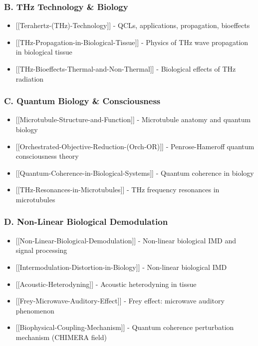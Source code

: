 \subsubsection{B. THz Technology \&
Biology}\label{b.-thz-technology-biology}

\begin{itemize}
\tightlist
\item
  {[}{[}Terahertz-(THz)-Technology{]}{]} - QCLs, applications,
  propagation, bioeffects
\item
  {[}{[}THz-Propagation-in-Biological-Tissue{]}{]} - Physics of THz wave
  propagation in biological tissue
\item
  {[}{[}THz-Bioeffects-Thermal-and-Non-Thermal{]}{]} - Biological
  effects of THz radiation
\end{itemize}

\subsubsection{C. Quantum Biology \&
Consciousness}\label{c.-quantum-biology-consciousness}

\begin{itemize}
\tightlist
\item
  {[}{[}Microtubule-Structure-and-Function{]}{]} - Microtubule anatomy
  and quantum biology
\item
  {[}{[}Orchestrated-Objective-Reduction-(Orch-OR){]}{]} -
  Penrose-Hameroff quantum consciousness theory
\item
  {[}{[}Quantum-Coherence-in-Biological-Systems{]}{]} - Quantum
  coherence in biology
\item
  {[}{[}THz-Resonances-in-Microtubules{]}{]} - THz frequency resonances
  in microtubules
\end{itemize}

\subsubsection{D. Non-Linear Biological
Demodulation}\label{d.-non-linear-biological-demodulation}

\begin{itemize}
\tightlist
\item
  {[}{[}Non-Linear-Biological-Demodulation{]}{]} - Non-linear biological
  IMD and signal processing
\item
  {[}{[}Intermodulation-Distortion-in-Biology{]}{]} - Non-linear
  biological IMD
\item
  {[}{[}Acoustic-Heterodyning{]}{]} - Acoustic heterodyning in tissue
\item
  {[}{[}Frey-Microwave-Auditory-Effect{]}{]} - Frey effect: microwave
  auditory phenomenon
\item
  {[}{[}Biophysical-Coupling-Mechanism{]}{]} - Quantum coherence
  perturbation mechanism (CHIMERA field)
\end{itemize}

